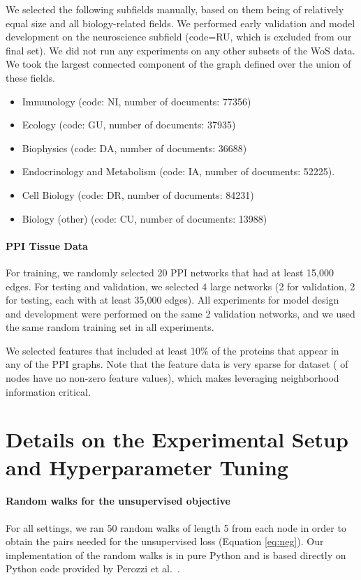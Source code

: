 We selected the following subfields manually, based on them being of relatively equal size and all biology-related fields.
We performed early validation and model development on the neuroscience subfield (code=RU, which is excluded from our final set). 
We did not run any experiments on any other subsets of the WoS data. 
We took the largest connected component of the graph defined over the union of these fields. 
\begin{itemize}
\item
Immunology (code: NI, number of documents: 77356)
\item
Ecology (code: GU, number of documents: 37935)
\item
Biophysics (code: DA, number of documents: 36688)
\item
Endocrinology and Metabolism (code: IA, number of documents: 52225). 
\item
Cell Biology (code: DR, number of documents: 84231)
\item
Biology (other) (code: CU, number of documents: 13988)
\end{itemize}

\paragraph{PPI Tissue Data}

For training, we randomly selected 20 PPI networks that had at least 15,000 edges. For testing and validation, we selected 4 large networks (2 for validation, 2 for testing, each with at least 35,000 edges). All experiments for model design and development were performed on the same 2 validation networks, and we used the same random training set in all experiments.

We selected features that included at least 10\% of the proteins that appear in any of the PPI graphs. 
Note that the feature data is very sparse for dataset ( of nodes have no non-zero feature values), which makes leveraging neighborhood information critical. 

\section{Details on the Experimental Setup and Hyperparameter Tuning}\label{inductive:sec:hyper}

\paragraph{Random walks for the unsupervised objective}
For all settings, we ran 50 random walks of length 5 from each node in order to obtain the pairs needed for the unsupervised loss (Equation \ref{eq:neg}).
Our implementation of the random walks is in pure Python and is based directly on Python code provided by Perozzi et al.~\cite{perozzi2014deepwalk}.

